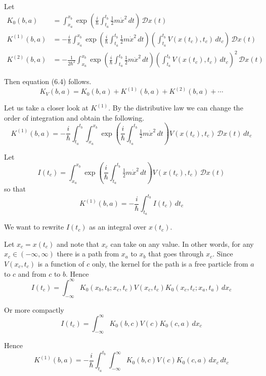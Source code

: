 \documentclass[12pt]{article}
\begin{document}
Let
\begin{align*}
K_0(b,a)&=\int_{x_a}^{x_b}\exp\left(\frac{i}{\hbar}\int_{t_a}^{t_b}\tfrac{1}{2}m\dot x^2\,dt\right)\,\mathcal Dx(t)
\tag{6.5}
\\
K^{(1)}(b,a)&=-\frac{i}{\hbar}
\int_{x_a}^{x_b}\exp\left(\frac{i}{\hbar}\int_{t_a}^{t_b}\tfrac{1}{2}m\dot x^2\,dt\right)
\left(\int_{t_a}^{t_b}V(x(t_c),t_c)\,dt_c\right)\,\mathcal Dx(t)
\\
K^{(2)}(b,a)&=-\frac{1}{2\hbar^2}
\int_{x_a}^{x_b}\exp\left(\frac{i}{\hbar}\int_{t_a}^{t_b}\tfrac{1}{2}m\dot x^2\,dt\right)
\left(\int_{t_a}^{t_b}V(x(t_c),t_c)\,dt_c\right)^2\,\mathcal Dx(t)
\end{align*}

Then equation (6.4) follows.
\begin{equation*}
K_V(b,a)=K_0(b,a)+K^{(1)}(b,a)+K^{(2)}(b,a)+\cdots
\tag{6.4}
\end{equation*}

Let us take a closer look at $K^{(1)}$.
By the distributive law we can change the order of integration
and obtain the following.
\begin{equation*}
K^{(1)}(b,a)=-\frac{i}{\hbar}
\int_{t_a}^{t_b}
\int_{x_a}^{x_b}\exp\left(\frac{i}{\hbar}\int_{t_a}^{t_b}\tfrac{1}{2}m\dot x^2\,dt\right)
V(x(t_c),t_c)
\,\mathcal Dx(t)\,dt_c
\end{equation*}

Let
\begin{equation*}
I(t_c)=
\int_{x_a}^{x_b}\exp\left(\frac{i}{\hbar}\int_{t_a}^{t_b}\tfrac{1}{2}m\dot x^2\,dt\right)
V(x(t_c),t_c)
\,\mathcal Dx(t)
\end{equation*}
so that
\begin{equation*}
K^{(1)}(b,a)=-\frac{i}{\hbar}\int_{t_a}^{t_b}I(t_c)\,dt_c
\end{equation*}

We want to rewrite $I(t_c)$ as an integral over $x(t_c)$.

\bigskip
Let $x_c=x(t_c)$ and note that $x_c$ can take on any value.
In other words, for any $x_c\in(-\infty,\infty)$ there is a path from $x_a$ to $x_b$
that goes through $x_c$.
Since $V(x_c,t_c)$ is a function of $c$ only,
the kernel for the path is a free particle from $a$ to $c$ and from $c$ to $b$.
Hence
\begin{equation*}
I(t_c)=\int_{-\infty}^{\infty}
K_0(x_b,t_b;x_c,t_c)V(x_c,t_c)K_0(x_c,t_c;x_a,t_a)
\,dx_c
\end{equation*}

Or more compactly
\begin{equation*}
I(t_c)=\int_{-\infty}^{\infty}
K_0(b,c)V(c)K_0(c,a)
\,dx_c
\end{equation*}

Hence
\begin{equation*}
K^{(1)}(b,a)=-\frac{i}{\hbar}
\int_{t_a}^{t_b}
\int_{-\infty}^{\infty}
K_0(b,c)V(c)K_0(c,a)
\,dx_c\,dt_c
\end{equation*}
\end{document}
